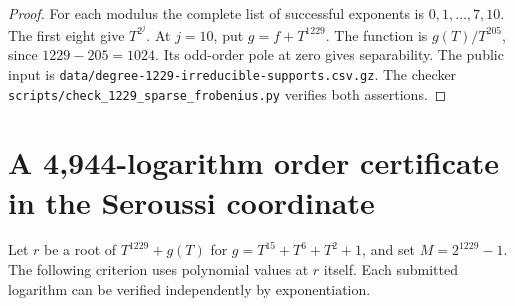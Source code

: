 \documentclass[11pt]{article}
\begin{document}
\begin{proof}
For each modulus the complete list of successful exponents is
\(0,1,\ldots,7,10\). The first eight give \(T^{2^j}\). At \(j=10\),
put \(g=f+T^{1229}\). The function is \(g(T)/T^{205}\), since
\(1229-205=1024\). Its odd-order pole at zero gives separability.
The public input is \nolinkurl{data/degree-1229-irreducible-supports.csv.gz}.
The checker \nolinkurl{scripts/check_1229_sparse_frobenius.py} verifies both assertions.
\end{proof}

\section{A 4,944-logarithm order certificate in the Seroussi coordinate}
\label{sec:seroussi-direct-moment}
Let \(r\) be a root of \(T^{1229}+g(T)\) for
\(g=T^{15}+T^6+T^2+1\), and set \(M=2^{1229}-1\). The following
criterion uses polynomial values at \(r\) itself. Each submitted
logarithm can be verified independently by exponentiation.
\end{document}
